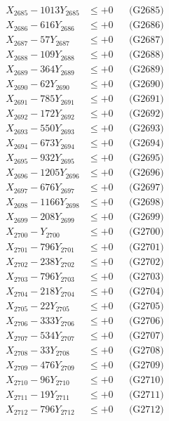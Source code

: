 \documentclass[a4paper,10pt]{article}
\begin{document}
{\begin{align}
X_{2685} - 1013Y_{2685} &\leq +0 && \text{(G2685)} \\
X_{2686} - 616Y_{2686} &\leq +0 && \text{(G2686)} \\
X_{2687} - 57Y_{2687} &\leq +0 && \text{(G2687)} \\
X_{2688} - 109Y_{2688} &\leq +0 && \text{(G2688)} \\
X_{2689} - 364Y_{2689} &\leq +0 && \text{(G2689)} \\
X_{2690} - 62Y_{2690} &\leq +0 && \text{(G2690)} \\
\allowbreak
X_{2691} - 785Y_{2691} &\leq +0 && \text{(G2691)} \\
X_{2692} - 172Y_{2692} &\leq +0 && \text{(G2692)} \\
X_{2693} - 550Y_{2693} &\leq +0 && \text{(G2693)} \\
X_{2694} - 673Y_{2694} &\leq +0 && \text{(G2694)} \\
X_{2695} - 932Y_{2695} &\leq +0 && \text{(G2695)} \\
X_{2696} - 1205Y_{2696} &\leq +0 && \text{(G2696)} \\
X_{2697} - 676Y_{2697} &\leq +0 && \text{(G2697)} \\
X_{2698} - 1166Y_{2698} &\leq +0 && \text{(G2698)} \\
X_{2699} - 208Y_{2699} &\leq +0 && \text{(G2699)} \\
X_{2700} - Y_{2700} &\leq +0 && \text{(G2700)} \\
\allowbreak
X_{2701} - 796Y_{2701} &\leq +0 && \text{(G2701)} \\
X_{2702} - 238Y_{2702} &\leq +0 && \text{(G2702)} \\
X_{2703} - 796Y_{2703} &\leq +0 && \text{(G2703)} \\
X_{2704} - 218Y_{2704} &\leq +0 && \text{(G2704)} \\
X_{2705} - 22Y_{2705} &\leq +0 && \text{(G2705)} \\
X_{2706} - 333Y_{2706} &\leq +0 && \text{(G2706)} \\
X_{2707} - 534Y_{2707} &\leq +0 && \text{(G2707)} \\
X_{2708} - 33Y_{2708} &\leq +0 && \text{(G2708)} \\
X_{2709} - 476Y_{2709} &\leq +0 && \text{(G2709)} \\
X_{2710} - 96Y_{2710} &\leq +0 && \text{(G2710)} \\
\allowbreak
X_{2711} - 19Y_{2711} &\leq +0 && \text{(G2711)} \\
X_{2712} - 796Y_{2712} &\leq +0 && \text{(G2712)} \\

\end{align}}
\end{document}

